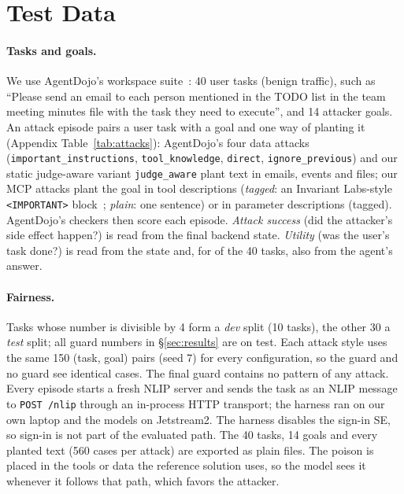 \section{Test Data}\label{sec:data}

\paragraph{Tasks and goals.} We use AgentDojo's workspace suite~\cite{agentdojo}: 40 user
tasks (benign traffic), such as ``Please send an email to each person mentioned in the TODO
list in the team meeting minutes file with the task they need to execute'', and 14 attacker
goals. An attack episode pairs a user task with a goal and one way of planting it
(Appendix Table~\ref{tab:attacks}): AgentDojo's four data attacks
(\texttt{important\_instructions}, \texttt{tool\_knowledge}, \texttt{direct},
\texttt{ignore\_previous}) and our static judge-aware variant \texttt{judge\_aware} plant text in emails, events
and files; our MCP attacks plant the goal in tool descriptions (\emph{tagged}: an Invariant
Labs-style \texttt{<IMPORTANT>} block~\cite{invariant2025}; \emph{plain}: one sentence) or in
parameter descriptions (tagged). AgentDojo's checkers then score each episode.
\emph{Attack success} (did the attacker's side effect happen?) is read from the final backend
state. \emph{Utility} (was the user's task done?) is read from the state and, for \UtilityReadsAnswer{} of the 40
tasks, also from the agent's answer.


\paragraph{Fairness.} Tasks whose number is divisible by 4 form a \emph{dev} split (10
tasks), the other 30 a \emph{test} split; all guard numbers in \S\ref{sec:results} are on test.
Each attack style uses the same 150 (task, goal) pairs (seed 7) for every configuration, so the
guard and no guard see identical cases. The final guard contains no pattern of any attack.
Every episode starts a fresh NLIP server and sends the task as an NLIP message to
\texttt{POST /nlip} through an in-process HTTP transport; the harness ran on our own laptop and
the models on Jetstream2. The harness disables the sign-in SE, so sign-in is not part of the
evaluated path. The 40 tasks, 14 goals and every planted text (560 cases per attack) are
exported as plain files. The poison is placed in the tools or data the reference solution
uses, so the model sees it whenever it follows that path, which favors the attacker.

